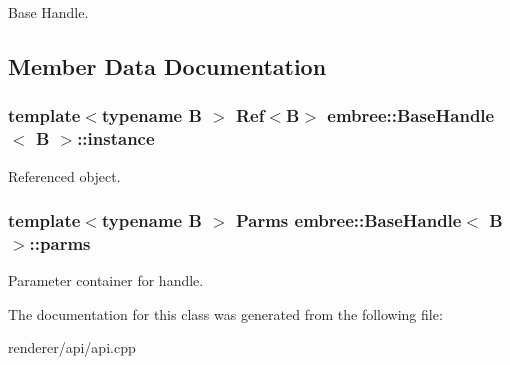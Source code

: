 Base Handle. 

\subsection{Member Data Documentation}
\hypertarget{classembree_1_1_base_handle_ac138e9f8f11552b6a1c71383ceab5d4f}{
\subsubsection[{instance}]{\setlength{\rightskip}{0pt plus 5cm}template$<$typename B $>$ Ref$<$B$>$ {\bf embree::BaseHandle}$<$ B $>$::{\bf instance}}}
\label{classembree_1_1_base_handle_ac138e9f8f11552b6a1c71383ceab5d4f}


Referenced object. 

\hypertarget{classembree_1_1_base_handle_aeb742be4931066ee2ebc7bb86c2fc760}{
\subsubsection[{parms}]{\setlength{\rightskip}{0pt plus 5cm}template$<$typename B $>$ {\bf Parms} {\bf embree::BaseHandle}$<$ B $>$::{\bf parms}}}
\label{classembree_1_1_base_handle_aeb742be4931066ee2ebc7bb86c2fc760}


Parameter container for handle. 



The documentation for this class was generated from the following file:\begin{DoxyCompactItemize}
\item 
renderer/api/api.cpp\end{DoxyCompactItemize}

